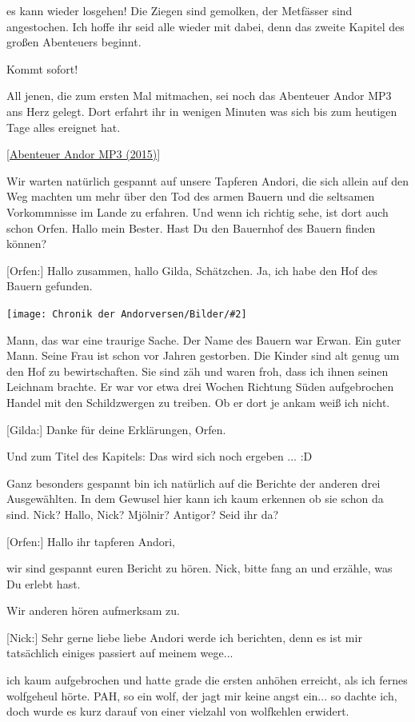 \documentclass[10pt, a4paper, oneside]{book}
\newcommand{\refstorytext}[1]{\hyperref[Storytext: #1]{#1}}
\newcommand{\bildmitts}[2][height=0.32\textwidth,width=0.48\textwidth,keepaspectratio]{%
    \begin{center}
        \texttt{[image: Chronik der Andorversen/Bilder/\#2]}
    \end{center}
}
\begin{document}
\begin{multicols}{2}
es kann wieder losgehen! Die Ziegen sind gemolken, der Metfässer sind angestochen. Ich hoffe ihr seid alle wieder mit dabei, denn das zweite Kapitel des großen Abenteuers beginnt.

Kommt sofort!

All jenen, die zum ersten Mal mitmachen, sei noch das Abenteuer Andor MP3 ans Herz gelegt. Dort erfahrt ihr in wenigen Minuten was sich bis zum heutigen Tage alles ereignet hat.

[\refstorytext{Abenteuer Andor MP3 (2015)}]

Wir warten natürlich gespannt auf unsere Tapferen Andori, die sich allein auf den Weg machten um mehr über den Tod des armen Bauern und die seltsamen Vorkommnisse im Lande zu erfahren. Und wenn ich richtig sehe, ist dort auch schon Orfen. Hallo mein Bester. Hast Du den Bauernhof des Bauern finden können?

[Orfen:] Hallo zusammen, hallo Gilda, Schätzchen. Ja, ich habe den Hof des Bauern gefunden.

\bildmitts{AA2015 Die rechte Hand des Königs 1.jpeg}

Mann, das war eine traurige Sache. Der Name des Bauern war Erwan. Ein guter Mann. Seine Frau ist schon vor Jahren gestorben. Die Kinder sind alt genug um den Hof zu bewirtschaften. Sie sind zäh und waren froh, dass ich ihnen seinen Leichnam brachte. Er war vor etwa drei Wochen Richtung Süden aufgebrochen Handel mit den Schildzwergen zu treiben. Ob er dort je ankam weiß ich nicht.

[Gilda:] Danke für deine Erklärungen, Orfen.

Und zum Titel des Kapitels: Das wird sich noch ergeben ... :D

Ganz besonders gespannt bin ich natürlich auf die Berichte der anderen drei Ausgewählten. In dem Gewusel hier kann ich kaum erkennen ob sie schon da sind. Nick? Hallo, Nick? Mjölnir? Antigor? Seid ihr da?

[Orfen:] Hallo ihr tapferen Andori,

wir sind gespannt euren Bericht zu hören. Nick, bitte fang an und erzähle, was Du erlebt hast.

Wir anderen hören aufmerksam zu.

[Nick:] Sehr gerne liebe liebe Andori werde ich berichten, denn es ist mir tatsächlich einiges passiert auf meinem wege...

ich kaum aufgebrochen und hatte grade die ersten anhöhen erreicht, als ich fernes wolfgeheul hörte. PAH, so ein wolf, der jagt mir keine angst ein... so dachte ich, doch wurde es kurz darauf von einer vielzahl von wolfkehlen erwidert.


\end{multicols}
\end{document}
